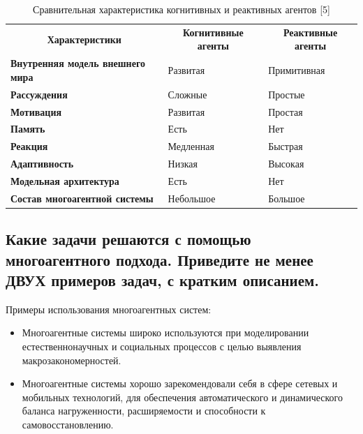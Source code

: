 \documentclass[14pt,a4paper,report]{report}
\begin{document}
\begin{table}[]
\caption{Сравнительная характеристика когнитивных и реактивных агентов [5]}
\begin{tabular}{lll}
\multicolumn{1}{c}{\textbf{Характеристики}} & \multicolumn{1}{c}{\textbf{Когнитивные агенты}} & \multicolumn{1}{c}{\textbf{Реактивные агенты}} \\
\textbf{Внутренняя модель внешнего мира}    & Развитая                                        & Примитивная                                    \\
\textbf{Рассуждения}                        & Сложные              & Простые          \\
\textbf{Мотивация}                          & Развитая                                        & Простая                                        \\
\textbf{Память}                             & Есть                                            & Нет                                            \\
\textbf{Реакция}                            & Медленная                                       & Быстрая                                        \\
\textbf{Адаптивность}                       & Низкая                                          & Высокая                                        \\
\textbf{Модельная архитектура}              & Есть                                            & Нет                                            \\
\textbf{Состав многоагентной системы}       & Небольшое & Большое  
\end{tabular}
\end{table}


\subsection{Какие задачи решаются с помощью многоагентного подхода. Приведите не менее ДВУХ примеров задач, с кратким описанием.}

Примеры использования многоагентных систем:

\begin{itemize}
	\item Многоагентные системы широко используются при моделировании естественнонаучных и социальных процессов с целью выявления макрозакономерностей.
	\item Многоагентные системы хорошо зарекомендовали себя в сфере сетевых и мобильных технологий, для обеспечения автоматического и динамического баланса нагруженности, расширяемости и способности к самовосстановлению.
\end{itemize}
\end{document}
